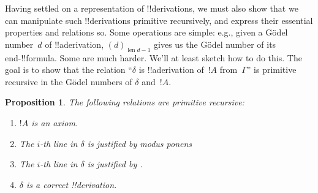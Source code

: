 \documentclass[10pt,a4paper]{article}
\theoremstyle{plain}
\newtheorem{prop}[thm]{Proposition}
\theoremstyle{definition}
\theoremstyle{remark}
\newenvironment{explain}{}{}
\newcommand*{\ollabel}[1]{\label{#1}}
\providecommand{\len}{\operatorname{len}}
\providecommand{\QR}{\mathrm{QR}}
\begin{document}
\begin{explain}
Having settled on a representation of !!{derivation}s, we must also
show that we can manipulate such !!{derivation}s primitive recursively, and
express their essential properties and relations so.  Some operations
are simple: e.g., given a G\"odel number~$d$ of !!a{derivation},
$(d)_{\len{d}-1}$ gives us the G\"odel number of its end-!!{formula}.  Some are
much harder.  We'll at least sketch how to do this.  The goal is to
show that the relation ``$\delta$ is !!a{derivation} of~$!A$
from~$\Gamma$'' is primitive recursive in the G\"odel numbers of
$\delta$ and~$!A$.
\end{explain}

\begin{prop}
\ollabel{prop:followsby}
The following relations are primitive recursive:
\begin{enumerate}
\item $!A$ is an axiom.
\item The $i$-th line in $\delta$ is justified by modus ponens
\item The $i$-th line in $\delta$ is justified by \QR.
\item $\delta$ is a correct !!{derivation}.
\end{enumerate}
\end{prop}
\end{document}

